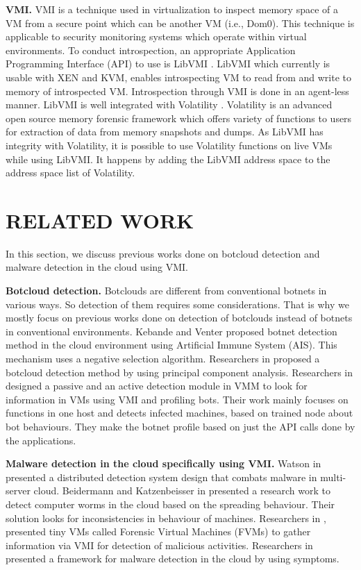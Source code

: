 \documentclass[conference]{IEEEtran}
\begin{document}
\textbf{VMI.}
VMI is a technique used in virtualization to inspect memory space of a VM from a secure point which can be another VM (i.e., Dom0). This technique is applicable to security monitoring systems which operate within virtual environments. To conduct introspection, an appropriate Application Programming Interface (API) to use is LibVMI \cite{ref11}. LibVMI which currently is usable with XEN and KVM, enables introspecting VM to read from and write to memory of introspected VM. Introspection through VMI is done in an agent-less manner. LibVMI is well integrated with Volatility \cite{ref19}. Volatility is an advanced open source memory forensic framework which offers variety of functions to users for extraction of data from memory snapshots and dumps. As LibVMI has integrity with Volatility, it is possible to use Volatility functions on live VMs while using LibVMI. It happens by adding the LibVMI address space to the address space list of Volatility.

\section{RELATED WORK}
In this section, we discuss previous works done on botcloud detection and malware detection in the cloud using VMI.
 
\textbf{Botcloud detection.}
Botclouds are different from conventional botnets in various ways. So detection of them requires some considerations. That is why we mostly focus on previous works done on detection of botclouds instead of botnets in conventional environments. Kebande and Venter \cite{ref3} proposed botnet detection method in the cloud environment using Artificial Immune System (AIS). This mechanism uses a negative selection algorithm. Researchers in \cite{ref41} proposed a botcloud detection method by using principal component analysis. Researchers in \cite{ref4} designed a passive and an active detection module in VMM to look for information in VMs using VMI and profiling bots. Their work mainly focuses on functions in one host and detects infected machines, based on trained node about bot behaviours. They make the botnet profile based on just the API calls done by the applications. 

\textbf{Malware detection in the cloud specifically using VMI.} 
Watson in \cite{ref13} presented a distributed detection system design that combats malware in multi-server cloud. Beidermann and Katzenbeisser in \cite{ref12} presented a research work to detect computer worms in the cloud based on the spreading behaviour. Their solution looks for inconsistencies in behaviour of machines. Researchers in \cite{ref7}, presented tiny VMs called Forensic Virtual Machines (FVMs) to gather information via VMI for detection of malicious activities. Researchers in \cite{ref6} presented a framework for malware detection in the cloud by using symptoms.
\end{document}
